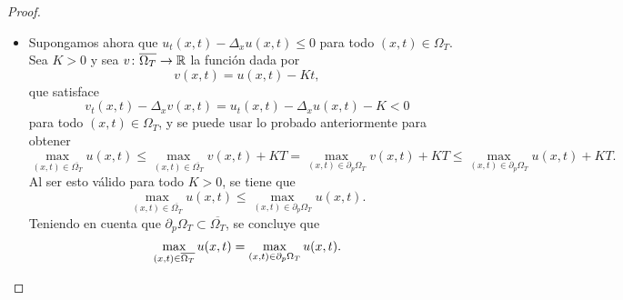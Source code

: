 \documentclass[a4paper, 12pt, extrafontsizes]{memoir}
\begin{document}
\begin{proof}
\begin{itemize}
        Recapitulando, se tiene que 
        \[(x_0,t_0) \in \overline{\Omega_{T-\varepsilon}} = \overline{\Omega} \times [0,T-\varepsilon], \qquad (x_0,t_0) \not\in \Omega \times (0,T-\varepsilon), \qquad (x_0,t_0) \not\in \Omega \times \{T-\varepsilon\}.\]
        Si fuese $x_0 \in \Omega$, entonces $t_0 \not\in (0,T-\varepsilon]$, luego $t_0 = 0$ y por tanto $(x_0,t_0) \in \overline{\Omega} \times \{0\}$. Y si fuese $x_0 \not\in \Omega$, entonces $x_0 \in \overline{\Omega} \setminus \Omega = \partial \Omega$ y por tanto $(x_0,t_0) \in \partial\Omega \times [0,T-\varepsilon]$. En cualquier caso, $(x_0,t_0) \in \partial_p\Omega_{T-\varepsilon}$, lo que prueba que
        \[\max_{(x,t)\in \overline{\Omega_{T-\varepsilon}}} u(x,t) = \max_{(x,t) \in \partial_p\Omega_{T-\varepsilon}}u(x,t).\]
        Una vez probado esto, es fácil quitar $\varepsilon$ de en medio, pues para todo $(x_0,t_0) \in \overline{\Omega} \times [0,T)$ existe $\varepsilon > 0$ tal que $(x,t) \in \overline{\Omega} \times [0,T-\varepsilon] = \overline{\Omega_{T-\varepsilon}}$, y usando lo anterior,
        \[u(x_0,t_0) \leq \max_{(x,t)\in \overline{\Omega_{T-\varepsilon}}} u(x,t) = \max_{(x,t) \in \partial_p\Omega_{T-\varepsilon}}u(x,t) \leq \max_{(x,t) \in \partial_p\Omega_T}u(x,t).\]
        Como $u$ es continua en $\overline{\Omega_T}$, esto debe tenerse también para $t_0 = T$, luego
        \[u(x_0,t_0) \leq  \max_{(x,t) \in \partial_p\Omega_T}u(x,t)\] 
        para todo $(x_0,t_0) \in \overline{\Omega_T}$, y por tanto
        \[\max_{(x,t) \in\overline{\Omega_T}}u(x,t) = \max_{(x,t) \in \partial_p\Omega_T}u(x,t).\]
        \item Supongamos ahora que $u_t(x,t)-\Delta_xu(x,t) \leq 0$ para todo $(x,t) \in \Omega_T$. Sea $K > 0$ y sea $v \colon \overline{\Omega_T} \to \mathbb R$ la función dada por
        \[v(x,t)=u(x,t)-Kt,\]
        que satisface
        \[v_t(x,t)-\Delta_xv(x,t) = u_t(x,t)-\Delta_xu(x,t)-K < 0\]
        para todo $(x,t) \in \Omega_T$, y se puede usar lo probado anteriormente para obtener
        \[\max_{(x,t) \in \overline{\Omega_T}}u(x,t) \leq \max_{(x,t) \in \overline{\Omega_T}}v(x,t)+KT = \max_{(x,t) \in \partial_p \Omega_T}v(x,t)+KT \leq \max_{(x,t) \in \partial_p \Omega_T}u(x,t)+KT.\]
        Al ser esto válido para todo $K>0$, se tiene que
        \[\max_{(x,t) \in \overline{\Omega_T}}u(x,t) \leq \max_{(x,t) \in \partial_p \Omega_T}u(x,t).\]
        Teniendo en cuenta que $\partial_p\Omega_T \subset \overline{\Omega_T} $, se concluye que
        \[\max_{(x,t) \in \overline{\Omega_T}}u(x,t) = \max_{(x,t) \in \partial_p \Omega_T}u(x,t). \qedhere\]
    \end{itemize}
\end{proof}
\end{document}
